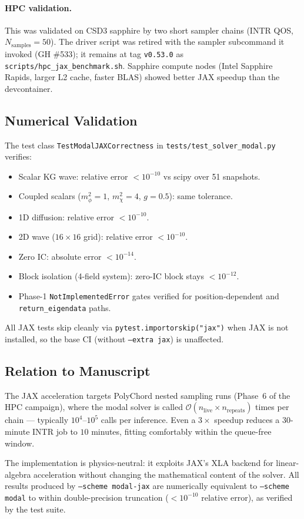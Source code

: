 \paragraph{HPC validation.}
This was validated on CSD3 sapphire by two short sampler chains (INTR QOS,
$N_{\mathrm{samples}}=50$).  The driver script was retired with the sampler
subcommand it invoked (GH \#533); it remains at tag \texttt{v0.53.0} as
\texttt{scripts/hpc\_jax\_benchmark.sh}.  Sapphire compute nodes (Intel
Sapphire Rapids, larger L2 cache, faster BLAS) showed better JAX speedup than
the devcontainer.

\subsection{Numerical Validation}
\label{sec:modal_jax_validation}

The test class \texttt{TestModalJAXCorrectness} in
\texttt{tests/test\_solver\_modal.py} verifies:

\begin{itemize}
  \item Scalar KG wave: relative error $<10^{-10}$ vs scipy over 51 snapshots.
  \item Coupled scalars ($m_\phi^2=1$, $m_\chi^2=4$, $g=0.5$): same tolerance.
  \item 1D diffusion: relative error $<10^{-10}$.
  \item 2D wave ($16\times16$ grid): relative error $<10^{-10}$.
  \item Zero IC: absolute error $<10^{-14}$.
  \item Block isolation (4-field system): zero-IC block stays $<10^{-12}$.
  \item Phase-1 \texttt{NotImplementedError} gates verified for
    position-dependent and \texttt{return\_eigendata} paths.
\end{itemize}

All JAX tests skip cleanly via \texttt{pytest.importorskip("jax")} when JAX
is not installed, so the base CI (without \texttt{--extra jax}) is unaffected.

\subsection{Relation to Manuscript}
\label{sec:modal_jax_manuscript}

The JAX acceleration targets PolyChord nested sampling runs (Phase~6 of the
HPC campaign), where the modal solver is called $\mathcal{O}(n_{\mathrm{live}}
\times n_{\mathrm{repeats}})$ times per chain — typically $10^4$--$10^5$
calls per inference.  Even a $3\times$ speedup reduces a $30$-minute INTR
job to $10$ minutes, fitting comfortably within the queue-free window.

The implementation is physics-neutral: it exploits JAX's XLA backend for
linear-algebra acceleration without changing the mathematical content of
the solver.  All results produced by \texttt{--scheme modal-jax} are
numerically equivalent to \texttt{--scheme modal} to within double-precision
truncation ($<10^{-10}$ relative error), as verified by the test suite.
